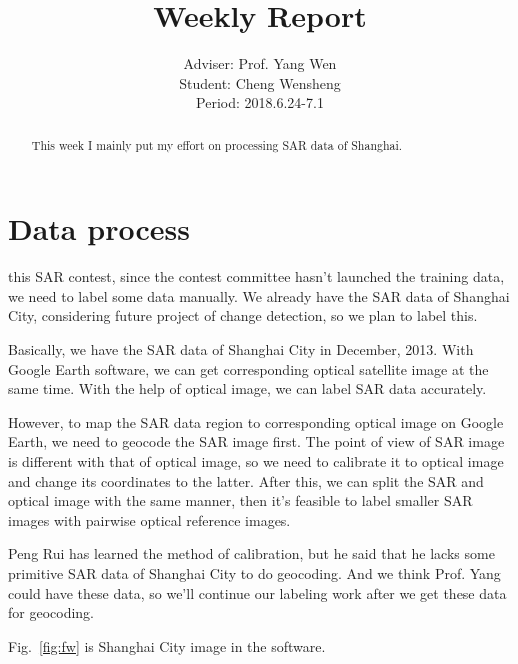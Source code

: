 \documentclass[]{IEEEtran}
\begin{document}
	\title{Weekly Report}
	\author{Adviser: Prof. Yang Wen \\Student: Cheng Wensheng\\ Period: 2018.6.24-7.1
	}
	\maketitle

\begin{abstract}
	This week I mainly put my effort on processing SAR data of Shanghai.
\end{abstract}

\section{Data process}
	 this SAR contest, since the contest committee hasn't launched the training data, we need to label some data manually. We already have the SAR data of Shanghai City, considering future project of change detection, so we plan to label this.

	Basically, we have the SAR data of Shanghai City in December, 2013. With Google Earth software, we can get corresponding optical satellite image at the same time. With the help of optical image, we can label SAR data accurately.
	
	However, to map the SAR data region to corresponding optical image on Google Earth, we need to geocode the SAR image first. The point of view of SAR image is different with that of optical image, so we need to calibrate it to optical image and change its coordinates to the latter. After this, we can split the SAR and optical image with the same manner, then it's feasible to label smaller SAR images with pairwise optical reference images.

	Peng Rui has learned the method of calibration, but he said that he lacks some primitive SAR data of Shanghai City to do geocoding. And we think Prof. Yang could have these data, so we'll continue our labeling work after we get these data for geocoding.
	
	Fig.~\ref{fig:fw} is Shanghai City image in the software. 
	
\end{document}
